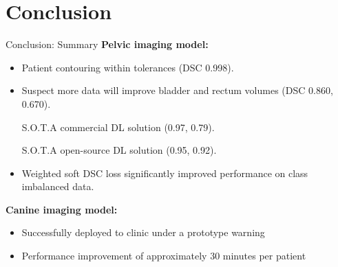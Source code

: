 \documentclass[9pt]{beamer}
\begin{document}
\section{Conclusion}
\begin{frame}{Conclusion: Summary}
\textbf{Pelvic imaging model:}
\begin{itemize}
	\item Patient contouring within tolerances (DSC 0.998).
	\item Suspect more data will improve bladder and rectum volumes (DSC 0.860, 0.670).

	S.O.T.A commercial DL solution (0.97, 0.79).\footnotemark[15]

	S.O.T.A open-source DL solution (0.95, 0.92).\footnotemark[16]
	\item Weighted soft DSC loss significantly improved performance on class imbalanced data.
  \end{itemize}

 \textbf{Canine imaging model:}
 \begin{itemize}
  \item Successfully deployed to clinic under a prototype warning
  \item Performance improvement of approximately 30 minutes per patient
\end{itemize}
\end{frame}
%
\end{document}
